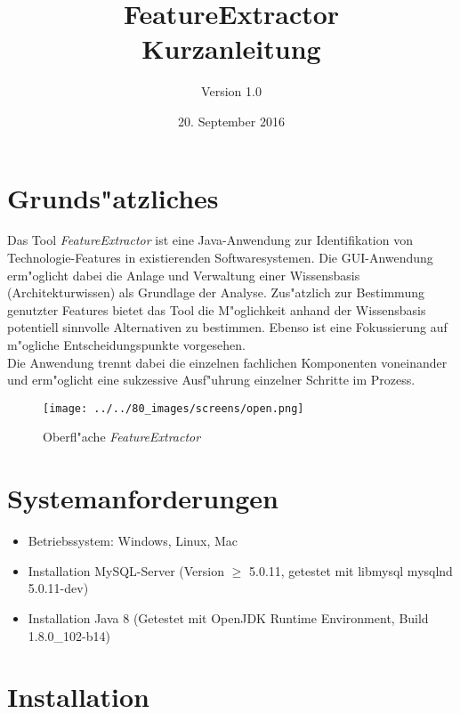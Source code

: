 \documentclass{proc}
\title{FeatureExtractor\\Kurzanleitung}
\author{Version 1.0}
\date{20. September 2016}
\begin{document}
	\maketitle
	\tableofcontents
	
	
	\section{Grunds"atzliches} 
	
	Das Tool \textit{FeatureExtractor} ist eine Java-Anwendung zur Identifikation von Technologie-Features in existierenden Softwaresystemen.
	Die GUI-Anwendung erm"oglicht dabei die Anlage und Verwaltung einer Wissensbasis (Architekturwissen) als Grundlage der Analyse.
	Zus"atzlich zur Bestimmung genutzter Features bietet das Tool die M"oglichkeit anhand der Wissensbasis potentiell sinnvolle Alternativen zu bestimmen.
	Ebenso ist eine Fokussierung auf m"ogliche Entscheidungspunkte vorgesehen.
	\\
	Die Anwendung trennt dabei die einzelnen fachlichen Komponenten voneinander und erm"oglicht eine sukzessive Ausf"uhrung einzelner Schritte im Prozess.
	
	\begin{figure}[h!]
		\centering
		\caption{Oberfl"ache \textit{FeatureExtractor}}
		\texttt{[image: ../../80\_images/screens/open.png]}
	\end{figure}
	
	\section{Systemanforderungen}
	
	\begin{itemize}
		\item Betriebssystem: Windows, Linux, Mac
		\item Installation MySQL-Server (Version $\geq$ 5.0.11, getestet mit libmysql mysqlnd 5.0.11-dev)
		\item Installation Java 8 (Getestet mit OpenJDK Runtime Environment, Build 1.8.0\_102-b14)
	\end{itemize}
	
	\section{Installation}
	
\end{document}
